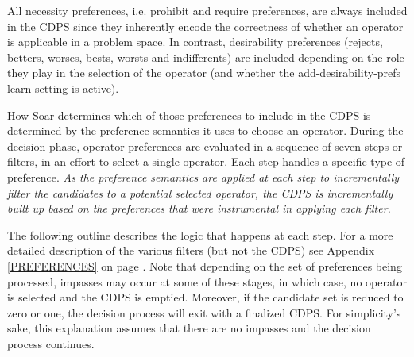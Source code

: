 All necessity preferences, i.e. prohibit and require preferences, are always
included in the CDPS since they inherently encode the correctness of whether an
operator is applicable in a problem space.  In contrast, desirability
preferences (rejects, betters, worses, bests, worsts and indifferents) are
included depending on the role they play in the selection of the operator (and
whether the add-desirability-prefs learn setting is active).

How Soar determines which of those preferences to include in the CDPS is determined by the preference semantics it uses to choose an operator.
During the decision phase, operator preferences are evaluated in a sequence of
seven steps or filters, in an effort to select a single operator. Each step
handles a specific type of preference.  \emph{As the preference semantics are applied
at each step to incrementally filter the candidates to a potential selected operator, the CDPS
is incrementally built up based on the preferences that were instrumental in applying each filter.}

The following outline describes the logic that happens at each step.  For a more
detailed description of the various filters (but not the CDPS) see Appendix
\ref{PREFERENCES} on page \pageref{PREFERENCES}.  Note that depending on the set of preferences being processed, impasses may occur at some
of these stages, in which case, no operator is selected and the CDPS is emptied.
 Moreover, if the candidate set is reduced to zero or one, the decision process
will exit with a finalized CDPS. For simplicity's sake, this explanation assumes
that there are no impasses and the decision process continues.

